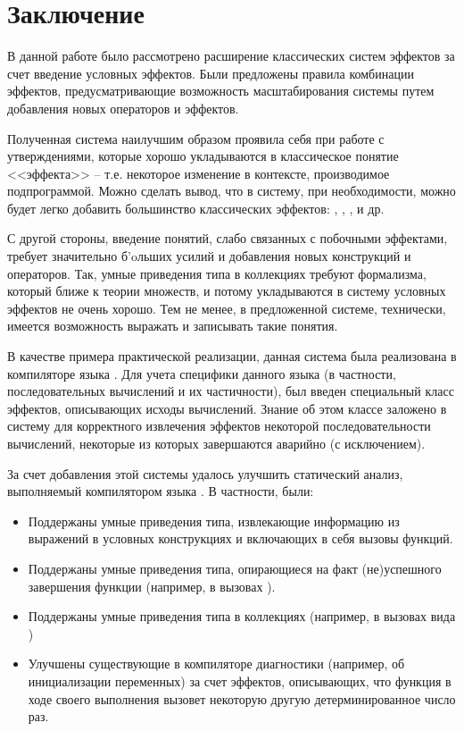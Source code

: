 \section*{Заключение}

В данной работе было рассмотрено расширение классических систем эффектов за счет введение условных эффектов. Были предложены правила комбинации эффектов, предусматривающие возможность масштабирования системы путем добавления новых операторов и эффектов.

Полученная система наилучшим образом проявила себя при работе с утверждениями, которые хорошо укладываются в классическое понятие <<эффекта>> -- т.е. некоторое изменение в контексте, производимое подпрограммой. Можно сделать вывод, что в систему, при необходимости, можно будет легко добавить большинство классических эффектов: , , , и др.

С другой стороны, введение понятий, слабо связанных с побочными эффектами, требует значительно б\a'{o}льших усилий и добавления новых конструкций и операторов. Так, умные приведения типа в коллекциях требуют формализма, который ближе к теории множеств, и потому укладываются в систему условных эффектов не очень хорошо. Тем не менее, в предложенной системе, технически, имеется возможность выражать и записывать такие понятия.

В качестве примера практической реализации, данная система была реализована в компиляторе языка . Для учета специфики данного языка (в частности, последовательных вычислений и их частичности), был введен специальный класс эффектов, описывающих исходы вычислений. Знание об этом классе заложено в систему для корректного извлечения эффектов некоторой последовательности вычислений, некоторые из которых завершаются аварийно (с исключением).

За счет добавления этой системы удалось улучшить статический анализ, выполняемый компилятором языка . В частности, были:

\begin{itemize}
  \item Поддержаны умные приведения типа, извлекающие информацию из выражений в условных конструкциях и включающих в себя вызовы функций.

  \item Поддержаны умные приведения типа, опирающиеся на факт (не)успешного завершения функции (например, в вызовах  ).

  \item Поддержаны умные приведения типа в коллекциях (например, в вызовах вида )

  \item Улучшены существующие в компиляторе диагностики (например, об инициализации переменных) за счет эффектов, описывающих, что функция в ходе своего выполнения вызовет некоторую другую детерминированное число раз.
\end{itemize}


